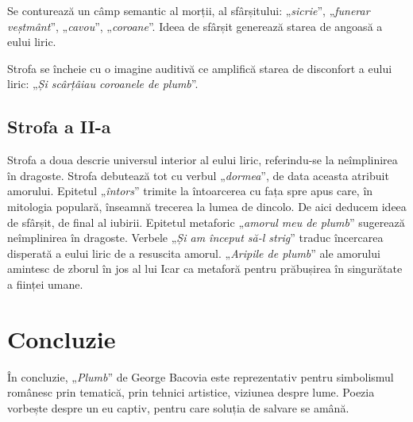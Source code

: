 \documentclass{article}
\newcommand{\qu}[1]{„\emph{#1}”}
\begin{document}
Se conturează un câmp semantic al morții, al sfârșitului: \qu{sicrie}, \qu{funerar veștmânt}, \qu{cavou}, \qu{coroane}. Ideea de sfârșit generează starea de angoasă a eului liric.

Strofa se încheie cu o imagine auditivă ce amplifică starea de disconfort a eului liric: \qu{Și scârțâiau coroanele de plumb}.

\subsection{Strofa a II-a}
Strofa a doua descrie universul interior al eului liric, referindu-se la neîmplinirea în dragoste. Strofa debutează tot cu verbul \qu{dormea}, de data aceasta atribuit amorului. Epitetul \qu{întors} trimite la întoarcerea cu fața spre apus care, în mitologia populară, înseamnă trecerea la lumea de dincolo. De aici deducem ideea de sfârșit, de final al iubirii. Epitetul metaforic \qu{amorul meu de plumb} sugerează neîmplinirea în dragoste. Verbele \qu{Și am început să-l strig} traduc încercarea disperată a eului liric de a resuscita amorul. \qu{Aripile de plumb} ale amorului amintesc de zborul în jos al lui Icar ca metaforă pentru prăbușirea în singurătate a ființei umane.

\section{Concluzie}
În concluzie, \qu{Plumb} de George Bacovia este reprezentativ pentru simbolismul românesc prin tematică, prin tehnici artistice, viziunea despre lume. Poezia vorbește despre un eu captiv, pentru care soluția de salvare se amână.
\end{document}
